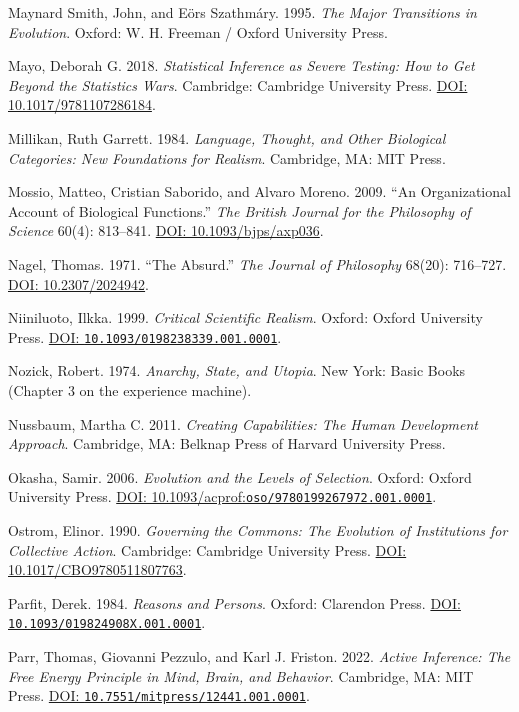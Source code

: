 \documentclass[
  english,
  11pt,
  oneside]{book}
\begin{document}
Maynard Smith, John, and Eörs Szathmáry. 1995. \emph{The Major Transitions in Evolution}. Oxford: W. H. Freeman / Oxford University Press.

Mayo, Deborah G. 2018. \emph{Statistical Inference as Severe Testing: How to Get Beyond the Statistics Wars}. Cambridge: Cambridge University Press. \href{https://doi.org/10.1017/9781107286184}{DOI: 10.1017/9781107286184}.

Millikan, Ruth Garrett. 1984. \emph{Language, Thought, and Other Biological Categories: New Foundations for Realism}. Cambridge, MA: MIT Press.

Mossio, Matteo, Cristian Saborido, and Alvaro Moreno. 2009. ``An Organizational Account of Biological Functions.'' \emph{The British Journal for the Philosophy of Science} 60(4): 813--841. \href{https://doi.org/10.1093/bjps/axp036}{DOI: 10.1093/bjps/axp036}.

Nagel, Thomas. 1971. ``The Absurd.'' \emph{The Journal of Philosophy} 68(20): 716--727. \href{https://doi.org/10.2307/2024942}{DOI: 10.2307/2024942}.

Niiniluoto, Ilkka. 1999. \emph{Critical Scientific Realism}. Oxford: Oxford University Press. \href{https://doi.org/10.1093/0198238339.001.0001}{DOI: \nolinkurl{10.1093/0198238339.001.0001}}.

Nozick, Robert. 1974. \emph{Anarchy, State, and Utopia}. New York: Basic Books (Chapter 3 on the experience machine).

Nussbaum, Martha C. 2011. \emph{Creating Capabilities: The Human Development Approach}. Cambridge, MA: Belknap Press of Harvard University Press.

Okasha, Samir. 2006. \emph{Evolution and the Levels of Selection}. Oxford: Oxford University Press. \href{https://doi.org/10.1093/acprof:oso/9780199267972.001.0001}{DOI: 10.1093/acprof:\nolinkurl{oso/9780199267972.001.0001}}.

Ostrom, Elinor. 1990. \emph{Governing the Commons: The Evolution of Institutions for Collective Action}. Cambridge: Cambridge University Press. \href{https://doi.org/10.1017/CBO9780511807763}{DOI: 10.1017/CBO9780511807763}.

Parfit, Derek. 1984. \emph{Reasons and Persons}. Oxford: Clarendon Press. \href{https://doi.org/10.1093/019824908X.001.0001}{DOI: \nolinkurl{10.1093/019824908X.001.0001}}.

Parr, Thomas, Giovanni Pezzulo, and Karl J. Friston. 2022. \emph{Active Inference: The Free Energy Principle in Mind, Brain, and Behavior}. Cambridge, MA: MIT Press. \href{https://doi.org/10.7551/mitpress/12441.001.0001}{DOI: \nolinkurl{10.7551/mitpress/12441.001.0001}}.
\end{document}
